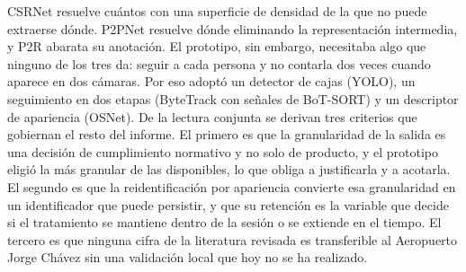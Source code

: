 CSRNet resuelve cuántos con una superficie de densidad de la que no puede extraerse dónde.
P2PNet resuelve dónde eliminando la representación intermedia, y P2R abarata su anotación.
El prototipo, sin embargo, necesitaba algo que ninguno de los tres da: seguir a cada persona y
no contarla dos veces cuando aparece en dos cámaras. Por eso adoptó un detector de cajas
(YOLO), un seguimiento en dos etapas (ByteTrack con señales de BoT-SORT) y un descriptor de
apariencia (OSNet). De la lectura conjunta se derivan tres criterios que gobiernan el resto del
informe. El primero es que la granularidad de la salida es una decisión de cumplimiento
normativo y no solo de producto, y el prototipo eligió la más granular de las disponibles, lo que
obliga a justificarla y a acotarla. El segundo es que la reidentificación por apariencia convierte
esa granularidad en un identificador que puede persistir, y que su retención es la variable que
decide si el tratamiento se mantiene dentro de la sesión o se extiende en el tiempo. El tercero es
que ninguna cifra de la literatura revisada es transferible al Aeropuerto Jorge Chávez sin una
validación local que hoy no se ha realizado.
